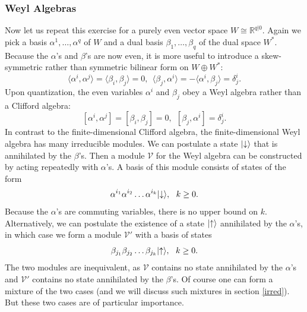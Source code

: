 \documentclass[11pt,a4paper]{article}
\def\V{{\mathcal V}}
\def\R{{\mathbb R}}
\def\V{{\mathcal V}}
\def\l{\langle}
\def\r{\rangle}
\def\neg{\negthickspace}
\begin{document}
\subsubsection{Weyl Algebras}\label{weyl}

Now let us repeat this exercise for a purely even vector space $W\cong \R^{q|0}$.  Again we pick a basis $\alpha^1,\dots,\alpha^q$
of $W$ and a dual basis $\beta_1,\dots,\beta_q$ of the dual space $W^*$.  Because the $\alpha$'s and $\beta$'s are now even,  it is
more useful to introduce a skew-symmetric rather than symmetric bilinear form on 
$W\oplus W^*$:
\begin{equation}\label{hokey} \l \alpha^i,\alpha^j\r = \l \beta_i,\beta_j\r = 0,~~ \l \beta_j,\alpha^i\r= -\l \alpha^i,\beta_j\r  = \delta^i_j. \end{equation}
Upon quantization, the even variables $\alpha^i$ and $\beta_j$ obey a Weyl algebra rather than a Clifford algebra:
\begin{equation}\label{dokey}[\alpha^i,\alpha^j]=[\beta_i,\beta_j]=0,~~[\beta_j,\alpha^i]=\delta^i_j. \end{equation}
In contrast to the finite-dimensional Clifford algebra, the finite-dimensional Weyl algebra has many irreducible modules.
We can postulate a state $|\neg\downarrow\rangle$ that is annihilated by the $\beta$'s.  Then a module $\V$ for the Weyl algebra can be constructed
by acting repeatedly with $\alpha$'s.  A basis of this module consists of states of the form
\begin{equation}\label{ubasis}\alpha^{i_1}\alpha^{i_2}\dots\alpha^{i_k}|\neg\downarrow\rangle,~~k\geq 0. \end{equation}
Because the $\alpha$'s are commuting variables, there is no upper bound on $k$.  Alternatively, we can postulate the existence of
a state $|\neg\uparrow\rangle$ annihilated by the $\alpha$'s, in which case we form a module $\V'$ with a basis of states 
\begin{equation}\label{nubasis} \beta_{j_1}\beta_{j_2}\dots\beta_{j_k}|\neg\uparrow\rangle,  ~~k\geq 0. \end{equation}
The two modules are inequivalent, as $\V$ contains no state annihilated by the $\alpha$'s and $\V'$ contains no state annihilated by the $\beta$'s.
Of course one can form a mixture of the two cases (and we will discuss such mixtures in section \ref{irred}).  But these two
cases are of particular importance.  
\end{document}
